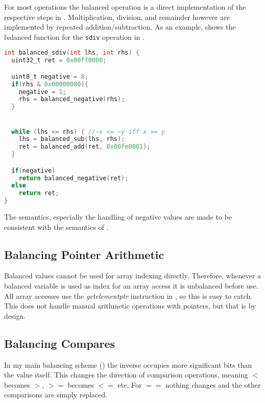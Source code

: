 For most operations the balanced operation is a direct implementation of the respective steps in .
Multiplication, division, and remainder however are implemented by repeated addition/subtraction.
As an example,  shows the balanced function for the \texttt{sdiv} operation in \ir{}.

\begin{lstlisting}[language=C, caption=Balanced sdiv, label=lst:sdiv]
int balanced_sdiv(int lhs, int rhs) {
  uint32_t ret = 0x00ff0000;

  uint8_t negative = 0;
  if(rhs & 0x00000080){
    negative = 1;
    rhs = balanced_negative(rhs);
  }


  while (lhs <= rhs) { //~x <= ~y iff x >= y
    lhs = balanced_sub(lhs, rhs);
    ret = balanced_add(ret, 0x00fe0001);
  }

  if(negative)
    return balanced_negative(ret);
  else
    return ret;
}
\end{lstlisting}

The semantics, especially the handling of negative values are made to be consistent with the semantics of \llvm{}.

\subsection{Balancing Pointer Arithmetic}
Balanced values cannot be used for array indexing directly.
Therefore, whenever a balanced variable is used as index for an array access it is unbalanced before use.
All array accesses use the \emph{getelementptr} instruction in \ir{}, so this is easy to catch.
This does not handle manual arithmetic operations with pointers, but that is by design.

\subsection{Balancing Compares}
In my main balancing scheme () the inverse occupies more significant bits than the value itself.
This changes the direction of comparison operations, meaning $<$ becomes $>$, $>=$ becomes $<=$ etc.
For $==$ nothing changes and the other comparisons are simply replaced.
